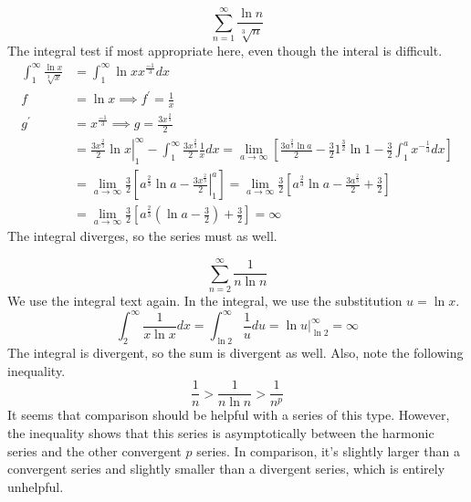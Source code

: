 \documentclass[fleqn]{report}
\begin{document}
\begin{example}
\begin{equation*}
\sum_{n=1}^\infty \frac{\ln n}{\sqrt[3]{n}}
\end{equation*}
The integral test if most appropriate here, even though the
interal is difficult.
\begin{align*}
\int_1^\infty \frac{\ln x}{\sqrt[3]{x}} & = \int_1^\infty \ln x
x^{\frac{-1}{3}} dx \\
f & = \ln x \implies f^\prime = \frac{1}{x} \\
g^\prime & = x^\frac{-1}{3} \implies g = \frac{3x^{\frac{2}{3}}}{2} \\
& = \left. \frac{3x^{\frac{2}{3}}}{2} \ln x \right|_1^\infty -
\int_1^\infty \frac{3x^{\frac{2}{3}}}{2} \frac{1}{x} dx 
= \lim_{a \rightarrow \infty} \left[ \frac{3a^{\frac{2}{3}}
\ln a}{2} - \frac{3}{2} 1^{\frac{3}{2}} \ln 1 - \frac{3}{2}
\int_1^a x^{-\frac{1}{3}} dx \right] \\
& = \lim_{a \rightarrow \infty} \frac{3}{2} \left[
a^{\frac{2}{3}} \ln a - \left. \frac{3x^{\frac{2}{3}}}{2}
\right|_1^a \right] 
= \lim_{a \rightarrow \infty} \frac{3}{2}\left[
a^{\frac{2}{3}} \ln a - \frac{3a^{\frac{2}{3}}}{2} + \frac{3}{2}
\right] \\
& = \lim_{a \rightarrow \infty} \frac{3}{2} \left[
a^{\frac{2}{3}} \left( \ln a - \frac{3}{2} \right) + \frac{3}{2}
\right] = \infty
\end{align*}
The integral diverges, so the series must as well.
\end{example}

\begin{example}
\begin{equation*}
\sum_{n=2}^\infty \frac{1}{n \ln n}
\end{equation*}
We use the integral text again. In the integral, we use the
substitution $u = \ln x$.
\begin{equation*}
\int_2^\infty \frac{1}{x \ln x} dx = \int_{\ln 2}^\infty
\frac{1}{u} du 
= \ln u \Big|_{\ln 2}^\infty = \infty 
\end{equation*}
The integral is divergent, so the sum is divergent as well.
Also, note the following inequality. 
\begin{equation*}
\frac{1}{n} > \frac{1}{n \ln n} > \frac{1}{n^p}
\end{equation*}
It seems that comparison should be helpful with a series of
this type. However, the inequality shows that this series is
asymptotically between the harmonic series and the other
convergent $p$ series. In comparison, it's slightly larger
than a convergent series and slightly smaller than a divergent
series, which is entirely unhelpful. 
\end{example}
\end{document}

